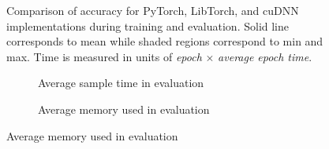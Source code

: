 \documentclass[portrait,final,archD,fontscale=0.477]{baposter}
\begin{document}
\begin{poster}
{\begin{figure}[H]
\begin{subfigure}{0.24\linewidth}
\begin{adjustbox}{width=\textwidth}
          
        \end{adjustbox}
      \end{subfigure}%
      \begin{subfigure}{0.24\textwidth}
        \centering
        \begin{adjustbox}{width=\textwidth}
          
        \end{adjustbox}
      \end{subfigure}
      \begin{subfigure}{0.24\textwidth}
        \centering
        \begin{adjustbox}{width=\textwidth}
          
        \end{adjustbox}
      \end{subfigure}
      \begin{subfigure}{0.24\textwidth}
        \centering
        \begin{adjustbox}{width=\textwidth}
          
        \end{adjustbox}
      \end{subfigure}
      \caption{Comparison of accuracy for PyTorch, LibTorch, and cuDNN implementations during training and evaluation. Solid line corresponds to mean while shaded regions correspond to min and max. Time is measured in units of \textit{epoch} $\times$ \textit{average epoch time}. }
      \label{fig:accuracy_results}
    \end{figure}
    \vspace{-3ex}
    \begin{figure}[H]
      \centering
      \begin{subfigure}{0.45\linewidth}
        \centering
        \begin{adjustbox}{width=\textwidth}
          
        \end{adjustbox}
        \caption{Average sample time in evaluation}\label{fig:eval_avg_sample_time}
      \end{subfigure}
      \begin{subfigure}{0.45\linewidth}
        \centering
        \begin{adjustbox}{width=\textwidth}
          
        \end{adjustbox}
        \caption{Average memory used in evaluation}\label{fig:eval_avg_used_mem}

\end{subfigure}
\end{figure}}
\end{poster}
\end{document}
